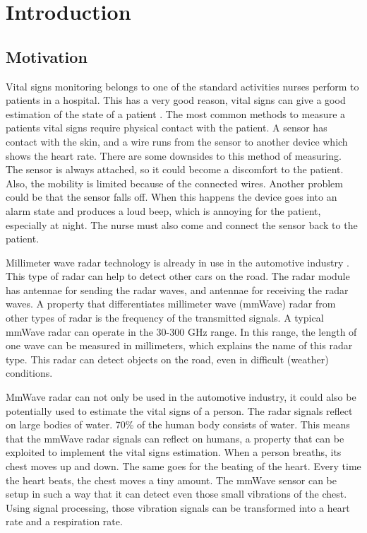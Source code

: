 \chapter{Introduction}
\label{chp:introduction}
\section{Motivation}
Vital signs monitoring belongs to one of the standard activities nurses perform to patients in a hospital. This has a very good reason, vital signs can give a good estimation of the state of a patient \cite{mok2015vital}. The most common methods to measure a patients vital signs require physical contact with the patient. A sensor has contact with the skin, and a wire runs from the sensor to another device which shows the heart rate. There are some downsides to this method of measuring. The sensor is always attached, so it could become a discomfort to the patient. Also, the mobility is limited because of the connected wires. Another problem could be that the sensor falls off. When this happens the device goes into an alarm state and produces a loud beep, which is annoying for the patient, especially at night. The nurse must also come and connect the sensor back to the patient.

Millimeter wave radar technology is already in use in the automotive industry \cite{mmwave_automotive}. This type of radar can help to detect other cars on the road. The radar module has antennae for sending the radar waves, and antennae for receiving the radar waves. A property that differentiates millimeter wave (mmWave) radar from other types of radar is the frequency of the transmitted signals. A typical mmWave radar can operate in the 30-300 GHz range. In this range, the length of one wave can be measured in millimeters, which explains the name of this radar type. This radar can detect objects on the road, even in difficult (weather) conditions. 

MmWave radar can not only be used in the automotive industry, it could also be potentially used to estimate the vital signs of a person. The radar signals reflect on large bodies of water. 70\% of the human body consists of water. This means that the mmWave radar signals can reflect on humans, a property that can be exploited to implement the vital signs estimation. When a person breaths, its chest moves up and down. The same goes for the beating of the heart. Every time the heart beats, the chest moves a tiny amount. The mmWave sensor can be setup in such a way that it can detect even those small vibrations of the chest. Using signal processing, those vibration signals can be transformed into a heart rate and a respiration rate. 

